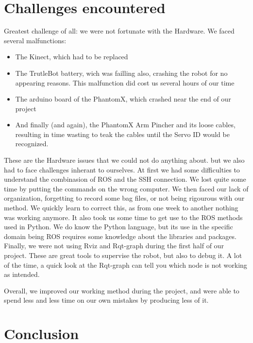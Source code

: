 \documentclass[aps,letterpaper,11pt]{revtex4}
\begin{document}
\section{Challenges encountered}
Greatest challenge of all: we were not fortunate with the Hardware. We faced several malfunctions: 

\begin{itemize}
  \item The Kinect, which had to be replaced
  \item The TrutleBot battery, wich was failling also, crashing the robot for no appearing reasons. This malfunction did cost us several hours of our time
  \item The arduino board of the PhantomX, which crashed near the end of our project
  \item And finally (and again), the PhantomX Arm Pincher and its loose cables, resulting in time wasting to teak the cables until the Servo ID would be recognized.
\end{itemize}

These are the Hardware issues that we could not do anything about. but we also had to face challenges inherant to ourselves.
At first we had some difficulties to understand the combinasion of ROS and the SSH connection. We lost quite some time by putting the commands on the wrong computer. We then faced our lack of organization, forgetting to record some bag files, or not being rigourous with our method. We quickly learn to correct this, as from one week to another nothing was working anymore. 
It also took us some time to get use to the ROS methods used in Python. We do know the Python language, but its use in the specific domain being ROS requires some knowledge about the libraries and packages.
Finally, we were not using Rviz and Rqt-graph during the first half of our project. These are great tools to supervise the robot, but also to debug it. A lot of the time, a quick look at the Rqt-graph can tell you which node is not working as intended.

Overall, we improved our working method during the project, and were able to spend less and less time on our own mistakes by producing less of it. 

\section{Conclusion}
\end{document}
